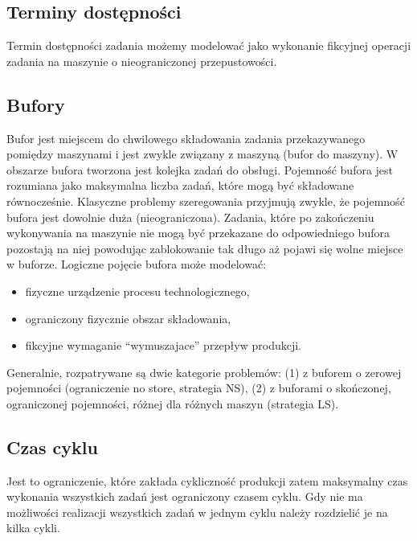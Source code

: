 	\subsection{Terminy dostępności}
	Termin dostępności zadania możemy modelować jako wykonanie fikcyjnej operacji zadania na maszynie o 
	nieograniczonej przepustowości.
	
	\subsection{Bufory}
	Bufor jest miejscem do chwilowego składowania zadania przekazywanego
	pomiędzy maszynami i jest zwykle związany z maszyną (bufor do maszyny).
	W obszarze bufora tworzona jest kolejka zadań do obsługi. Pojemność
	bufora jest rozumiana jako maksymalna liczba zadań, które mogą być składowane
	równocześnie. Klasyczne problemy szeregowania przyjmują zwykle,
	że pojemność bufora jest dowolnie duża (nieograniczona). Zadania, które po
	zakończeniu wykonywania na maszynie nie mogą być przekazane do odpowiedniego
	bufora pozostają na niej powodując zablokowanie tak długo aż
	pojawi się wolne miejsce w buforze. Logiczne pojęcie bufora może modelować:
	\begin{itemize}
		\item fizyczne urządzenie procesu technologicznego,
		\item ograniczony fizycznie obszar składowania,
		\item fikcyjne wymaganie “wymuszajace” przepływ produkcji.
	\end{itemize}
	Generalnie, rozpatrywane są dwie kategorie problemów: (1) z buforem o
	zerowej pojemności (ograniczenie no store, strategia NS), (2) z buforami o
	skończonej, ograniczonej pojemności, różnej dla różnych maszyn (strategia
	LS).
	
	\subsection{Czas cyklu}
	Jest to ograniczenie, które zakłada cykliczność produkcji zatem maksymalny czas wykonania wszystkich zadań
	jest ograniczony czasem cyklu. Gdy nie ma możliwości realizacji wszystkich zadań w jednym cyklu należy rozdzielić 
	je na kilka cykli.